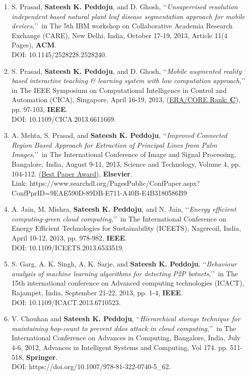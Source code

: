 \begin{enumerate}
	\item
	S. Prasad, \textbf{Sateesh K. Peddoju}, and D. Ghosh, \lq\lq \textit{Unsupervised resolution independent based natural plant leaf disease segmentation approach for mobile devices},\rq\rq\, in The 5th IBM workshop on Collaborative Academia Research Exchange (CARE), New Delhi, India,  October 17-19, 2013, Article 11(4 Pages), \textbf{ACM}. \\DOI: 10.1145/2528228.2528240.
	
	\item
	S. Prasad, \textbf{Sateesh K. Peddoju}, and D. Ghosh, \lq\lq \textit{Mobile augmented reality based interactive teaching \& learning system with low computation approach},\rq\rq\, in The IEEE Symposium on Computational Intelligence in Control and Automation (CICA), Singapore, April 16-19, 2013, (\underline{ERA/CORE Rank: \textbf{C}}), pp. 97-103, \textbf{IEEE}. \\DOI: 10.1109/CICA.2013.6611669.
	
	\item
	A. Mehta, S. Prasad, and  \textbf{Sateesh K. Peddoju}, \lq\lq \textit{Improved Connected Region Based Approach for Extraction of Principal Lines from Palm Images},\rq\rq\, in The International Conference of Image and Signal Processing, Bangalore, India, August 9-11, 2013, Science and Technology, Volume 4, pp. 104-112. \underline{(Best Paper Award)}, \textbf{Elsevier}. \\ Link: https://www.searchdl.org/PagesPublic/ConfPaper.aspx?ConfPprID=9EAE590D-89DB-E711-A40B-E4B3180586B9
	
	\item
	A. Jain, M. Mishra, \textbf{Sateesh K. Peddoju}, and N. Jain, \lq\lq \textit{Energy efficient computing-green cloud computing},\rq\rq\, in The International Conference on Energy Efficient Technologies for Sustainability (ICEETS), Nagercoil, India, April 10-12, 2013, pp. 978-982, \textbf{IEEE}. \\DOI: 10.1109/ICEETS.2013.6533519.
	
	\item
	S. Garg, A. K. Singh, A. K. Sarje, and \textbf{Sateesh K. Peddoju}, \lq\lq \textit{Behaviour analysis of machine learning algorithms for detecting P2P botnets},\rq\rq\, in The 15th international conference on Advanced computing technologies (ICACT), Rajampet, India, September 21-22, 2013, pp. 1-4,  \textbf{IEEE}. \\DOI: 10.1109/ICACT.2013.6710523.	
	
	\item
	V. Chouhan and \textbf{Sateesh K. Peddoju}, \lq\lq \textit{Hierarchical storage technique for maintaining hop-count to prevent ddos attack in cloud computing},\rq\rq\, in The International Conference on Advances in Computing, Bangalore, India, July 4-6, 2012, Advances in Intelligent Systems and Computing, Vol 174. pp. 511-518, \textbf{Springer}. \\DOI: https://doi.org/10.1007/978-81-322-0740-5\_62.
	

\end{enumerate}
